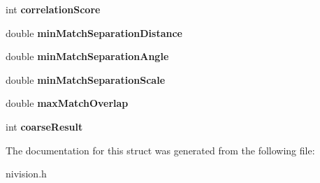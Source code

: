 \begin{DoxyCompactItemize}
\item 
\hypertarget{structMatchGeometricPatternAdvancedOptions__struct_accfd9c131880eb372c43eeef695a8107}{int {\bfseries correlation\-Score}}\label{structMatchGeometricPatternAdvancedOptions__struct_accfd9c131880eb372c43eeef695a8107}

\item 
\hypertarget{structMatchGeometricPatternAdvancedOptions__struct_a0811b0bde6155c77d1e744028c502820}{double {\bfseries min\-Match\-Separation\-Distance}}\label{structMatchGeometricPatternAdvancedOptions__struct_a0811b0bde6155c77d1e744028c502820}

\item 
\hypertarget{structMatchGeometricPatternAdvancedOptions__struct_a246b926988f26ae32bc09e37340f5ed9}{double {\bfseries min\-Match\-Separation\-Angle}}\label{structMatchGeometricPatternAdvancedOptions__struct_a246b926988f26ae32bc09e37340f5ed9}

\item 
\hypertarget{structMatchGeometricPatternAdvancedOptions__struct_a9984cae75cea1ad7fc8a88369880f4f2}{double {\bfseries min\-Match\-Separation\-Scale}}\label{structMatchGeometricPatternAdvancedOptions__struct_a9984cae75cea1ad7fc8a88369880f4f2}

\item 
\hypertarget{structMatchGeometricPatternAdvancedOptions__struct_ad86fa5208c7176daff50428394e0fbdd}{double {\bfseries max\-Match\-Overlap}}\label{structMatchGeometricPatternAdvancedOptions__struct_ad86fa5208c7176daff50428394e0fbdd}

\item 
\hypertarget{structMatchGeometricPatternAdvancedOptions__struct_a59dcbe2cc45d6f9dfeed4f0fa463d6d6}{int {\bfseries coarse\-Result}}\label{structMatchGeometricPatternAdvancedOptions__struct_a59dcbe2cc45d6f9dfeed4f0fa463d6d6}

\end{DoxyCompactItemize}


\-The documentation for this struct was generated from the following file\-:\begin{DoxyCompactItemize}
\item 
nivision.\-h\end{DoxyCompactItemize}
